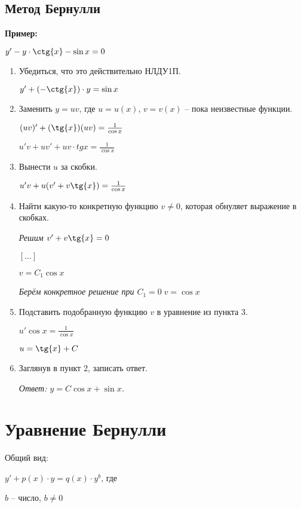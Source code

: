 \documentclass[10pt, a4paper]{article}
\begin{document}
\subsection{Метод Бернулли}
\textbf{Пример:}
\par $y' - y \cdot \ctg{x} - \sin{x} = 0$
\begin{enumerate}
    \item Убедиться, что это действительно НЛДУ1П.
        \par $y' + (-\ctg{x}) \cdot y = \sin{x}$
    \item Заменить $y = uv$, где $u = u(x)$, $v = v(x)$ -- пока неизвестные функции.
        \par $(uv)' + (\tg{x})(uv) = \frac{1}{\cos{x}}$
        \par $u'v + uv' + uv \cdot tg{x} = \frac{1}{\cos{x}}$
    \item Вынести $u$ за скобки.
        \par $u'v + u(v' + v\tg{x}) = \frac{1}{\cos{x}}$
    \item Найти какую-то конкретную функцию $v \neq 0$, которая обнуляет выражение в скобках.
        \par \textit{Решим $v' + v\tg{x} = 0$}
        \par $[...]$
        \par $v = C_{1}\cos{x}$
        \par \textit{Берём конкретное решение при $C_{1} = 0 \; v = \cos{x}$}
    \item Подставить подобранную функцию $v$ в уравнение из пункта 3.
        \par $u'\cos{x} = \frac{1}{\cos{x}}$
        \par $u = \tg{x} + C$
    \item Заглянув в пункт 2, записать ответ.
        \par\textit{Ответ: $y = C\cos{x} + \sin{x}$.}
\end{enumerate}


\section{Уравнение Бернулли}
Общий вид:
\par $y' + p(x) \cdot y = q(x) \cdot y^b$, где
\par $b$ -- число, $b \neq 0$
\end{document}
